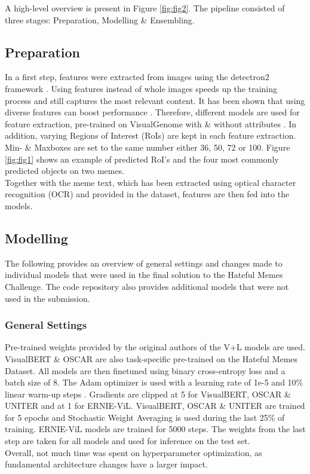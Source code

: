 \documentclass{article}
\begin{document}
A high-level overview is present in Figure \ref{fig:fig2}. The pipeline consisted of three stages: Preparation, Modelling \& Ensembling.

\subsection{Preparation}

In a first step, features were extracted from images using the detectron2 framework \cite{wu2019detectron2}. Using features instead of whole images speeds up the training process and still captures the most relevant content. It has been shown that using diverse features can boost performance \cite{jiang2018pythia}. Therefore, different models are used for feature extraction, pre-trained on VisualGenome with \& without attributes \cite{Anderson2017up-down}. In addition, varying Regions of Interest (RoIs) are kept in each feature extraction. Min- \& Maxboxes are set to the same number either 36, 50, 72 or 100. Figure \ref{fig:fig1} shows an example of predicted RoI's and the four most commonly predicted objects on two memes. \\
Together with the meme text, which has been extracted using optical character recognition (OCR) and provided in the dataset, features are then fed into the models.

\subsection{Modelling}

The following provides an overview of general settings and changes made to individual models that were used in the final solution to the Hateful Memes Challenge. The code repository also provides additional models that were not used in the submission. 

\subsubsection{General Settings}

Pre-trained weights provided by the original authors of the V+L models are used. VisualBERT \& OSCAR are also task-specific pre-trained on the Hateful Memes Dataset. All models are then finetuned using binary cross-entropy loss and a batch size of 8. The Adam optimizer \cite{kingma2019method} is used with a learning rate of 1e-5 and 10\% linear warm-up steps \cite{ma2019adequacy}. Gradients are clipped at 5 for VisualBERT, OSCAR \& UNITER and at 1 for ERNIE-ViL. VisualBERT, OSCAR \& UNITER are trained for 5 epochs and Stochastic Weight Averaging \cite{izmailov2018averaging} is used during the last 25\% of training. ERNIE-ViL models are trained for 5000 steps. The weights from the last step are taken for all models and used for inference on the test set. \\
Overall, not much time was spent on hyperparameter optimization, as fundamental architecture changes have a larger impact. 
\end{document}
